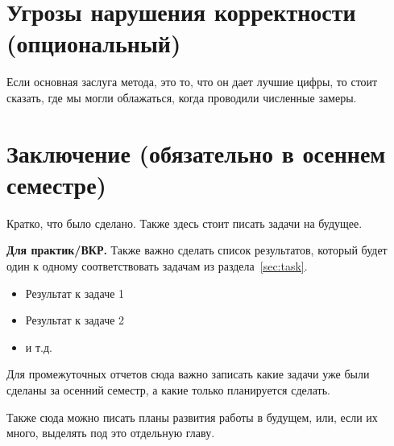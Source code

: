 \section{Угрозы нарушения корректности (опциональный)}

Если основная заслуга метода, это то, что он дает лучшие цифры, то стоит сказать, где мы могли облажаться, когда проводили численные замеры. 

\section{Заключение (обязательно в осеннем семестре)}

Кратко, что было сделано. Также здесь стоит писать задачи на будущее.

\textbf{Для практик/ВКР.} Также важно сделать список результатов, который будет один к одному соответствовать задачам из раздела~\ref{sec:task}.

\begin{itemize}
\item Результат к задаче 1 
\item Результат к задаче 2
\item и т.д.
\end{itemize}
\noindent Для промежуточных отчетов сюда важно записать какие задачи уже были сделаны за осенний семестр, а какие только планируется сделать.

Также сюда можно писать планы развития работы в будущем, или, если их много, выделять под это отдельную главу.


\setmonofont[Mapping=tex-text]{CMU Typewriter Text}




